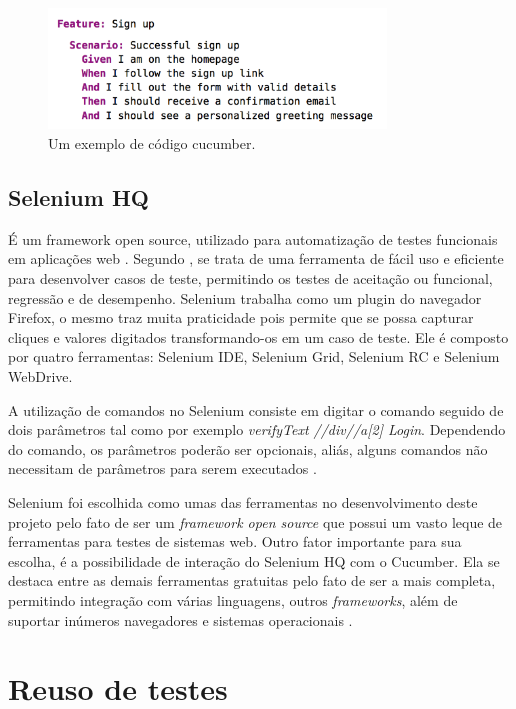 \documentclass[tg]{mdtufsm}
\begin{document}
\begin{figure}[!htb]
    \centering
    \includegraphics[width=0.8\textwidth]{codigo_cucumber}
    \caption{Um exemplo de código cucumber.}
    \label{fig:codigo_cucumber}
\end{figure}

\subsection{Selenium HQ}
É um framework open source, utilizado para automatização de testes funcionais em aplicações web \cite{chiavegatto1desenvolvimento}. Segundo \citeauthor{pereiraestudoselenium} \cite{pereiraestudoselenium}, se trata
de uma ferramenta de fácil uso e eficiente para desenvolver casos de teste, permitindo os testes de aceitação ou funcional, regressão e de desempenho.
Selenium trabalha como um plugin do navegador Firefox, o mesmo traz muita praticidade pois permite que se possa capturar cliques e valores digitados transformando-os em um caso de teste. Ele é composto por
quatro ferramentas: Selenium IDE, Selenium Grid, Selenium RC e Selenium WebDrive.

A  utilização  de  comandos  no  Selenium  consiste  em  digitar  o  comando  seguido  de  dois parâmetros  tal  como  por  exemplo \emph{verifyText //div//a[2] Login}. Dependendo  do  comando,  os parâmetros
poderão ser opcionais, aliás, alguns comandos não necessitam de parâmetros para serem executados \cite{sixpenceautomatizaccao}.

Selenium foi escolhida como umas das ferramentas no desenvolvimento deste projeto pelo fato de ser um \emph{framework open source} que possui um vasto leque de ferramentas para testes de sistemas web. Outro fator
importante para sua escolha, é a possibilidade de interação do Selenium HQ com o Cucumber. Ela  se  destaca  entre  as demais ferramentas  gratuitas pelo fato de ser a mais completa, permitindo integração com
várias linguagens,  outros \emph{frameworks}, além de suportar inúmeros navegadores e sistemas operacionais \cite{pereiraestudoselenium}.

\section{Reuso de testes}
\end{document}
